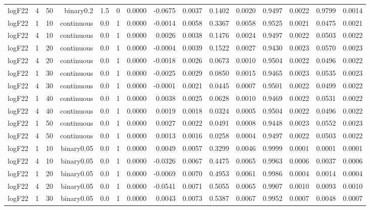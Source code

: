 \begin{longtable}{rrrrrrrrrrrrrrr}
  logF22 & 4 & 50 & binary0.2 & 1.5 & 0 & 0.0000 & -0.0675 & 0.0037 & 0.1402 & 0.0020 & 0.9497 & 0.0022 & 0.9799 & 0.0014 \\ 
  logF22 & 1 & 10 & continuous & 0.0 & 1 & 0.0000 & -0.0014 & 0.0058 & 0.3367 & 0.0058 & 0.9525 & 0.0021 & 0.0475 & 0.0021 \\ 
  logF22 & 4 & 10 & continuous & 0.0 & 1 & 0.0000 & 0.0026 & 0.0038 & 0.1476 & 0.0024 & 0.9497 & 0.0022 & 0.0503 & 0.0022 \\ 
  logF22 & 1 & 20 & continuous & 0.0 & 1 & 0.0000 & -0.0004 & 0.0039 & 0.1522 & 0.0027 & 0.9430 & 0.0023 & 0.0570 & 0.0023 \\ 
  logF22 & 4 & 20 & continuous & 0.0 & 1 & 0.0000 & -0.0018 & 0.0026 & 0.0673 & 0.0010 & 0.9504 & 0.0022 & 0.0496 & 0.0022 \\ 
  logF22 & 1 & 30 & continuous & 0.0 & 1 & 0.0000 & -0.0025 & 0.0029 & 0.0850 & 0.0015 & 0.9465 & 0.0023 & 0.0535 & 0.0023 \\ 
  logF22 & 4 & 30 & continuous & 0.0 & 1 & 0.0000 & -0.0001 & 0.0021 & 0.0445 & 0.0007 & 0.9501 & 0.0022 & 0.0499 & 0.0022 \\ 
  logF22 & 1 & 40 & continuous & 0.0 & 1 & 0.0000 & 0.0038 & 0.0025 & 0.0628 & 0.0010 & 0.9469 & 0.0022 & 0.0531 & 0.0022 \\ 
  logF22 & 4 & 40 & continuous & 0.0 & 1 & 0.0000 & 0.0019 & 0.0018 & 0.0324 & 0.0005 & 0.9504 & 0.0022 & 0.0496 & 0.0022 \\ 
  logF22 & 1 & 50 & continuous & 0.0 & 1 & 0.0000 & 0.0027 & 0.0022 & 0.0491 & 0.0008 & 0.9448 & 0.0023 & 0.0552 & 0.0023 \\ 
  logF22 & 4 & 50 & continuous & 0.0 & 1 & 0.0000 & 0.0013 & 0.0016 & 0.0258 & 0.0004 & 0.9497 & 0.0022 & 0.0503 & 0.0022 \\ 
  logF22 & 1 & 10 & binary0.05 & 0.0 & 1 & 0.0000 & 0.0049 & 0.0057 & 0.3299 & 0.0046 & 0.9999 & 0.0001 & 0.0001 & 0.0001 \\ 
  logF22 & 4 & 10 & binary0.05 & 0.0 & 1 & 0.0000 & -0.0326 & 0.0067 & 0.4475 & 0.0065 & 0.9963 & 0.0006 & 0.0037 & 0.0006 \\ 
  logF22 & 1 & 20 & binary0.05 & 0.0 & 1 & 0.0000 & -0.0069 & 0.0070 & 0.4953 & 0.0061 & 0.9986 & 0.0004 & 0.0014 & 0.0004 \\ 
  logF22 & 4 & 20 & binary0.05 & 0.0 & 1 & 0.0000 & -0.0541 & 0.0071 & 0.5055 & 0.0065 & 0.9907 & 0.0010 & 0.0093 & 0.0010 \\ 
  logF22 & 1 & 30 & binary0.05 & 0.0 & 1 & 0.0000 & 0.0043 & 0.0073 & 0.5387 & 0.0067 & 0.9952 & 0.0007 & 0.0048 & 0.0007 \\ 

\end{longtable}
